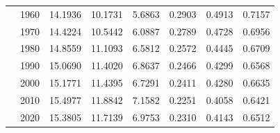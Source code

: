 \begin{table}[h]
\begin{tabular*}{\textwidth}{@{\extracolsep{\fill}}llrrrrrr}
 & 1960 & 14.1936 & 10.1731 & 5.6863 & 0.2903 & 0.4913 & 0.7157\\
 & 1970 & 14.4224 & 10.5442 & 6.0887 & 0.2789 & 0.4728 & 0.6956\\
 & 1980 & 14.8559 & 11.1093 & 6.5812 & 0.2572 & 0.4445 & 0.6709\\
 & 1990 & 15.0690 & 11.4020 & 6.8637 & 0.2466 & 0.4299 & 0.6568\\
 & 2000 & 15.1771 & 11.4395 & 6.7291 & 0.2411 & 0.4280 & 0.6635\\
 & 2010 & 15.4977 & 11.8842 & 7.1582 & 0.2251 & 0.4058 & 0.6421\\
 & 2020 & 15.3805 & 11.7139 & 6.9753 & 0.2310 & 0.4143 & 0.6512\\
\bottomrule
\end{tabular*}
\end{table}
